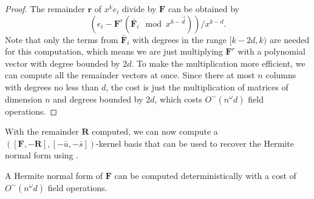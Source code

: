 \begin{proof}
The remainder $\mathbf{r}$ of $x^{k}e_{i}$ divide by $\mathbf{F}$
can be obtained by 
\[
\left(e_{i}-\mathbf{F}^{r}\left(\bar{\mathbf{F}}_{i}\mod x^{k-\vec{d}}\right)\right)/x^{k-d}.
\]
Note that only the terms from $\bar{\mathbf{F}}_{i}$ with degrees
in the range $[k-2d,k)$ are needed for this computation, which means
we are just multiplying $\mathbf{F}^{r}$ with a polynomial vector
with degree bounded by $2d$. To make the multiplication more efficient,
we can compute all the remainder vectors at once. Since there at most
$n$ columns with degrees no less than $d$, the cost is just the
multiplication of matrices of dimension $n$ and degrees bounded by
$2d$, which costs $O^{\sim}\left(n^{\omega}d\right)$ field operations.
\end{proof}
With the remainder $\mathbf{R}$ computed, we can now compute a $\left(\left[\mathbf{F},-\mathbf{R}\right],\left[-\bar{u},-\bar{s}\right]\right)$-kernel
basis that can be used to recover the Hermite normal form using .
\begin{thm}
A Hermite normal form of $\mathbf{F}$ can be computed deterministically
with a cost of \textup{$O^{\sim}\left(n^{\omega}d\right)$ field operations.}\end{thm}

